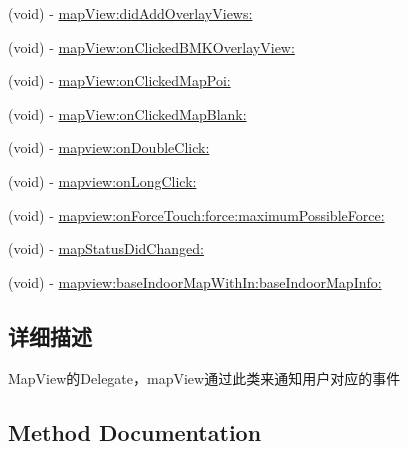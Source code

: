 \begin{DoxyCompactItemize}
\item 
(void) -\/ \hyperlink{protocol_b_m_k_map_view_delegate-p_a4eb0201fbe51ecd74d3b678a139435bf}{map\+View\+:did\+Add\+Overlay\+Views\+:}
\item 
(void) -\/ \hyperlink{protocol_b_m_k_map_view_delegate-p_a92829c083dcbd0b60209abb023b109fe}{map\+View\+:on\+Clicked\+B\+M\+K\+Overlay\+View\+:}
\item 
(void) -\/ \hyperlink{protocol_b_m_k_map_view_delegate-p_ac3e98436fce2ee14c02837200e57a6fe}{map\+View\+:on\+Clicked\+Map\+Poi\+:}
\item 
(void) -\/ \hyperlink{protocol_b_m_k_map_view_delegate-p_a7e98b75f0edfc05ed93fda98f3fb682e}{map\+View\+:on\+Clicked\+Map\+Blank\+:}
\item 
(void) -\/ \hyperlink{protocol_b_m_k_map_view_delegate-p_a957fb04d2fb88bd0e45ad9d712c1e85f}{mapview\+:on\+Double\+Click\+:}
\item 
(void) -\/ \hyperlink{protocol_b_m_k_map_view_delegate-p_abdef3e78c6a4d51665bc859e16c629a4}{mapview\+:on\+Long\+Click\+:}
\item 
(void) -\/ \hyperlink{protocol_b_m_k_map_view_delegate-p_a1715deab8f5cc59b50c05d222712f163}{mapview\+:on\+Force\+Touch\+:force\+:maximum\+Possible\+Force\+:}
\item 
(void) -\/ \hyperlink{protocol_b_m_k_map_view_delegate-p_a06d810eed5ca8add043ab4cd9367f14f}{map\+Status\+Did\+Changed\+:}
\item 
(void) -\/ \hyperlink{protocol_b_m_k_map_view_delegate-p_a9f922d89f1bd54dcc17f4951ccc62fad}{mapview\+:base\+Indoor\+Map\+With\+In\+:base\+Indoor\+Map\+Info\+:}
\end{DoxyCompactItemize}


\subsection{详细描述}
Map\+View的\+Delegate，map\+View通过此类来通知用户对应的事件 

\subsection{Method Documentation}
\hypertarget{protocol_b_m_k_map_view_delegate-p_a06d810eed5ca8add043ab4cd9367f14f}{}
